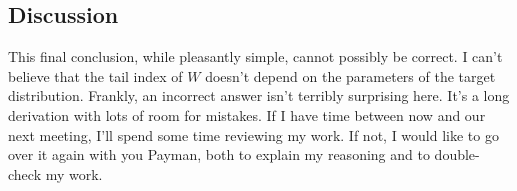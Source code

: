 \documentclass{article}
\begin{document}
\subsection{Discussion}

This final conclusion, while pleasantly simple, cannot possibly be correct. I can't believe that the tail index of $W$ doesn't depend on the parameters of the target distribution. Frankly, an incorrect answer isn't terribly surprising here. It's a long derivation with lots of room for mistakes. If I have time between now and our next meeting, I'll spend some time reviewing my work. If not, I would like to go over it again with you Payman, both to explain my reasoning and to double-check my work.



\end{document}
